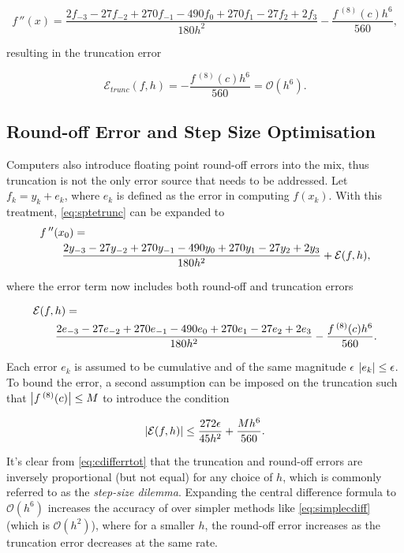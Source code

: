 \begin{equation}
f\,''(x) = \frac{2f_{-3}-27f_{-2}+270f_{-1}-490f_{0}+270f_{1}-27f_{2}+2f_{3}}{180h^{2}}-\frac{f\,^{(8)}(c)h^6}{560},\label{eq:sptetrunc}
\end{equation}

resulting in the truncation error

\begin{equation}
\mathcal{E}_{trunc}(f,h) = -\frac{f\,^{(8)}(c)h^6}{560} = \mathcal{O}(h^6).\label{eq:etrunc}
\end{equation}

\subsection{Round-off Error and Step Size Optimisation}\label{sec:cdiffstep}

Computers also introduce floating point round-off errors into the mix, thus truncation is not the only error source that needs to be addressed.
Let $f_k = y_k +e_k$, where $e_k$ is defined as the error in computing $f(x_k)$. With this treatment, \cref{eq:sptetrunc} can be expanded to
\begin{align}
\MoveEqLeft f\,''(x_0) = \nonumber\\
&\frac{2y_{-3}-27y_{-2}+270y_{-1}-490y_{0}+270y_{1}-27y_{2}+2y_{3}}{180h^{2}}+\mathcal{E}(f,h),\label{eq:sptye}
\end{align}

where the error term now includes both round-off and truncation errors

\begin{align}
\MoveEqLeft \mathcal{E}(f,h) = \nonumber\\
&\frac{2e_{-3}-27e_{-2}+270e_{-1}-490e_{0}+270e_{1}-27e_{2}+2e_{3}}{180h^{2}}-\frac{f\,^{(8)}(c)h^6}{560}.
\end{align}

Each error $e_k$ is assumed to be cumulative and of the same magnitude $\epsilon$ \ie $\left\lvert e_k\right\rvert \leq \epsilon$.
To bound the error, a second assumption can be imposed on the truncation such that $\left\lvert f\,^{(8)}(c)\right\rvert \leq M$ to introduce the condition

\begin{equation}
\left\lvert \mathcal{E}(f,h)\right\rvert \leq \frac{272\epsilon}{45h^2}+\frac{Mh^6}{560}.\label{eq:cdifferrtot}
\end{equation}

It's clear from \cref{eq:cdifferrtot} that the truncation and round-off errors are inversely proportional (but not equal) for any choice of $h$, which is commonly referred to as the \emph{step-size dilemma}.
Expanding the central difference formula to $\mathcal{O}(h^6)$ increases the accuracy of over simpler methods like \cref{eq:simplecdiff} (which is $\mathcal{O}(h^2)$), where for a smaller $h$, the round-off error increases as the truncation error decreases at the same rate.

